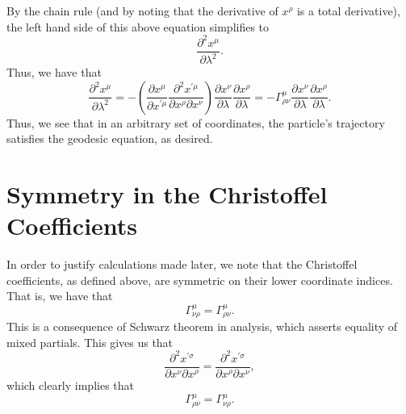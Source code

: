\documentclass[12pt]{article}
\theoremstyle{definition}
\theoremstyle{remark}
\begin{document}
	By the chain rule (and by noting that the derivative of $x^{ \rho}$ is a total derivative), the left hand side of this above equation simplifies to 
		\[
		\frac{ \partial^2 x^{ \mu } }{ \partial \lambda^2 }.
		\]
	Thus, we have that 
		\[
		\frac{ \partial^2 x^{ \mu } }{ \partial \lambda^2 }
		= 
		-
		\left( 
		\frac{ \partial x^{ \mu } }{ \partial x^{ \prime \mu } }
		\frac{ \partial^2 x^{ \prime \mu } }{\partial x^{ \rho } \partial x^{ \nu } }
		\right)
		\frac{ \partial x^{ \nu } }{ \partial \lambda }
		\frac{ \partial x^{ \rho } }{\partial \lambda }
		=
		-
		\Gamma^{\mu}_{\rho \nu} 
		\frac{ \partial x^{ \nu } }{ \partial \lambda }
		\frac{ \partial x^{ \rho } }{\partial \lambda }.
		\]
	Thus, we see that in an arbitrary set of coordinates, the particle's trajectory satisfies the geodesic equation, as desired.  

\section{Symmetry in the Christoffel Coefficients}
	In order to justify calculations made later, we note that the Christoffel coefficients, as defined above, are symmetric on their lower coordinate indices.  That is, we have that 
		\[
		\Gamma^{ \mu }_{ \nu \rho } 
		= 
		\Gamma^{ \mu }_{ \rho \nu }.
		\]
	This is a consequence of Schwarz theorem in analysis, which asserts equality of mixed partials.  This gives us that 
		\[
		\frac{ \partial^2 x^{ \prime \sigma } }{ \partial x^{ \nu }  \partial x^{ \rho } } 
		=
		\frac{ \partial^2 x^{ \prime \sigma } }{ \partial x^{ \rho }  \partial x^{ \nu } },
		\]
	which clearly implies that 
		\[
		\Gamma_{ \rho \nu }^{ \mu } = \Gamma_{ \nu \rho }^{ \mu } .
		\]
\end{document}
